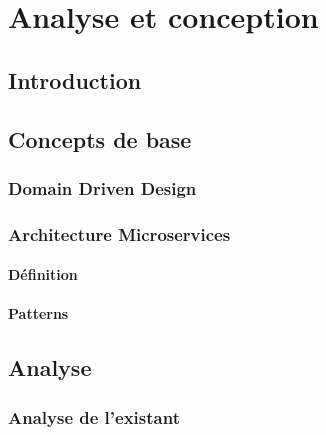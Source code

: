 \chapter{Analyse et conception}

\newpage

\section*{Introduction}


\section{Concepts de base}

\subsection{Domain Driven Design}




\subsection{Architecture Microservices}

\subsubsection{Définition}


\subsubsection{Patterns}


\section{Analyse}

\subsection{Analyse de l'existant}



